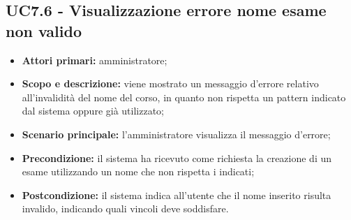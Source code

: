 \documentclass[AnalisiDeiRequisiti.tex]{subfiles}
\begin{document}
\subsection{UC7.6 - Visualizzazione errore nome esame non valido}
\begin{itemize}
	\item \textbf{Attori primari:} amministratore;
	\item \textbf{Scopo e descrizione:} viene mostrato un messaggio d'errore relativo all'invalidità del nome del corso, in quanto non rispetta un pattern indicato dal sistema oppure già utilizzato;
	\item \textbf{Scenario principale:} l'amministratore visualizza il messaggio d'errore;
	\item \textbf{Precondizione:} il sistema ha ricevuto come richiesta la creazione di un esame utilizzando un nome che non rispetta i  indicati; 
	\item \textbf{Postcondizione:} il sistema indica all'utente che il nome inserito risulta invalido, indicando quali vincoli deve soddisfare.
\end{itemize}

\end{document}
